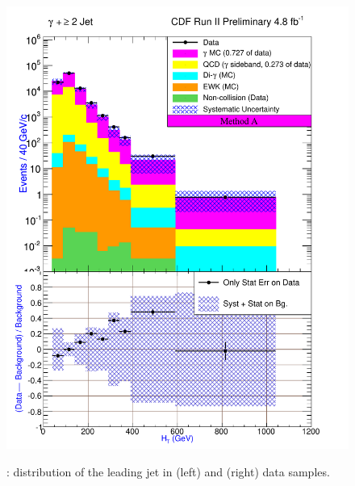 \documentclass[11pt]{article}
\begin{document}
\begin{figure}[h!]
{ \includegraphics[scale=\resultsHistScale,keepaspectratio=true]{./g30jet_MtdA_plot2_Ht.pdf}
}
 \caption{: \Ht distribution of the leading jet in \phoonejet (left) and \photwojet (right) data samples.}
 \label{fig:Result_MtdA_gj1_Ht}
\end{figure}
\end{document}
